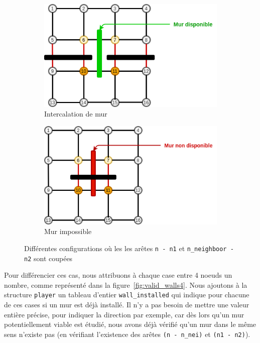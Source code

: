 \documentclass[a4paper]{article}
\begin{document}
\begin{figure}[ht]
    \centering
    \begin{subfigure}{.5\textwidth}
        \centering
        \includegraphics[width=1\linewidth]{valid_walls2.png}
        \caption{Intercalation de mur}
        \label{fig:valid_walls2}
    \end{subfigure}%
    \begin{subfigure}{.5\textwidth}
        \centering
        \includegraphics[width=1\linewidth]{valid_walls3.png}
        \caption{Mur impossible}
        \label{fig:valid_walls3}
    \end{subfigure}
    
    \caption{Différentes configurations où les les arêtes \texttt{n - n1} et \texttt{n\_neighboor - n2} sont coupées}
    \label{fig:valid_walls_trouble}
\end{figure}

Pour différencier ces cas, nous attribuons à chaque case entre 4 noeuds un nombre, comme représenté dans la figure~\ref{fig:valid_walls4}. Nous ajoutons à la structure \texttt{player} un tableau d'entier \texttt{wall\_installed} qui indique pour chacune de ces cases si un mur est déjà installé. Il n'y a pas besoin de mettre une valeur entière précise, pour indiquer la direction par exemple, car dès lors qu'un mur potentiellement viable est étudié, nous avons déjà vérifié qu'un mur dans le même sens n'existe pas (en vérifiant l'existence des arêtes \texttt{(n~-~n\_nei)} et \texttt{(n1~-~n2)}). \\
\end{document}
